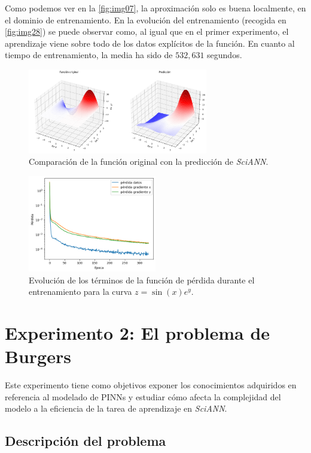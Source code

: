 Como podemos ver en la \autoref{fig:img07}, la aproximación solo es buena localmente, en el dominio de entrenamiento. En la evolución del entrenamiento (recogida en \autoref{fig:img28}) se puede observar como, al igual que en el primer experimento, el aprendizaje viene sobre todo de los datos explícitos de la función. En cuanto al tiempo de entrenamiento, la media ha sido de $532,631$ segundos.
\begin{figure}[htbp]
    \centering
    \includegraphics[width=0.7\textwidth]{img/img07.png}
    \caption{Comparación de la función original con la predicción de \textit{SciANN}.}
    \label{fig:img07}
\end{figure}
\begin{figure}[htbp]
    \centering
    \includegraphics[width=0.5\textwidth]{img/img28.png}
    \caption{Evolución de los términos de la función de pérdida durante el entrenamiento para la curva $z=\sin(x)e^{y}$.}
    \label{fig:img28}
\end{figure}



\section{Experimento 2: El problema de Burgers}

Este experimento tiene como objetivos exponer los conocimientos adquiridos en referencia al modelado de PINNs y estudiar cómo afecta la complejidad del modelo a la eficiencia de la tarea de aprendizaje en \textit{SciANN}. 

\subsection{Descripción del problema}

